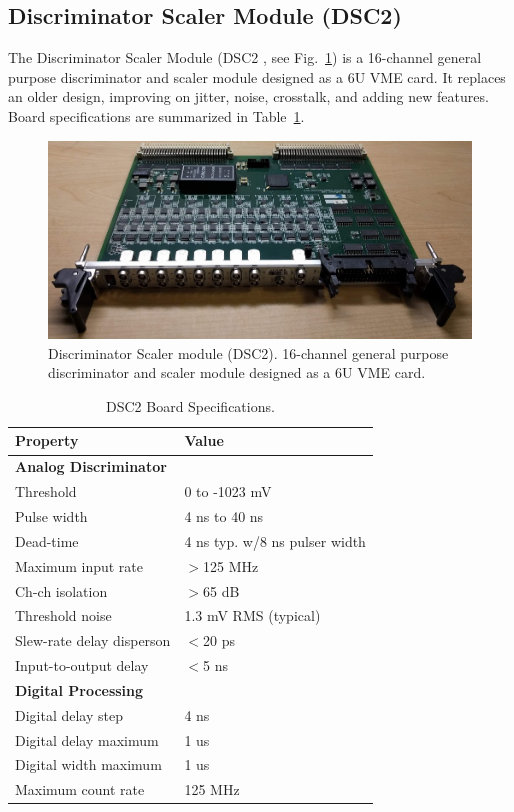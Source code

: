 \subsection{Discriminator Scaler Module (DSC2)}

The Discriminator Scaler Module (DSC2 \cite{dsc2-ref}, see Fig.~\ref{fig:dsc2_board}) is a 16-channel general purpose discriminator and scaler module designed as a 6U VME card. It replaces an older design, improving on jitter, noise, crosstalk, and adding new features.  Board specifications are summarized in Table~\ref{tab:dsc2_specifications}. 

\begin{figure}[hbt]
	\centering
	\includegraphics[width=1.0\columnwidth,keepaspectratio]{img/dsc2_board.png}
	\caption{Discriminator Scaler module (DSC2). 16-channel general purpose discriminator and scaler module designed as a 6U VME card.}
	\label{fig:dsc2_board}
\end{figure}

\begin{table}
\begin{adjustbox}{width=\columnwidth,center}
	\begin{tabular}{| l | l |}
		\hline \hline
		Property			& Value				\\
		\hline
		{\bf Analog Discriminator}	&				\\
		Threshold			& 0 to -1023 mV			\\
		Pulse width			& 4 ns to 40 ns			\\
		Dead-time			& 4 ns typ. w/8 ns pulser width	\\
		Maximum input rate		& $>$125 MHz 			\\
		Ch-ch isolation			& $>$65 dB			\\
		Threshold noise			& 1.3 mV RMS (typical)		\\
		Slew-rate delay disperson	& $<$20 ps			\\
		Input-to-output delay		& $<$5 ns			\\
		{\bf Digital Processing}	&				\\
		Digital delay step		& 4 ns				\\
		Digital delay maximum		& 1 us				\\
		Digital width maximum		& 1 us				\\
		Maximum count rate		& 125 MHz			\\
		\hline \hline
	\end{tabular}
\end{adjustbox}
\caption{DSC2 Board Specifications.}
\label{tab:dsc2_specifications}
\end{table}

